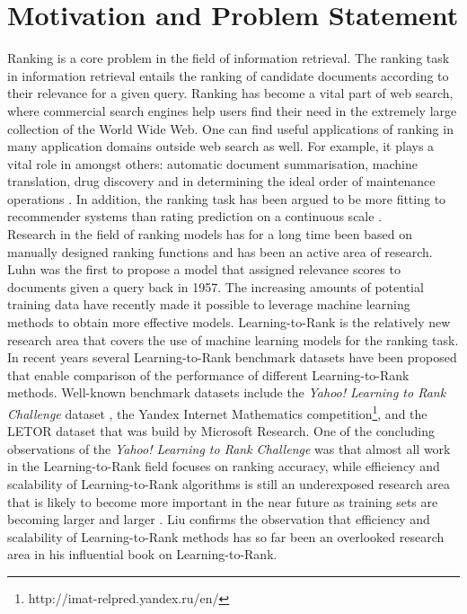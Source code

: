 \chapter{Motivation and Problem Statement}
Ranking is a core problem in the field of information retrieval. The ranking task in information retrieval entails the ranking of candidate documents according to their relevance for a given query. Ranking has become a vital part of web search, where commercial search engines help users find their need in the extremely large collection of the World Wide Web. One can find useful applications of ranking in many application domains outside web search as well. For example, it plays a vital role in amongst others: automatic document summarisation, machine translation, drug discovery and in determining the ideal order of maintenance operations \cite{Rudin2009}. In addition, the ranking task has been argued to be more fitting to recommender systems than rating prediction on a continuous scale \cite{Adomavicius2005,McNee2006}.\\

Research in the field of ranking models has for a long time been based on manually designed ranking functions and has been an active area of research. Luhn \cite{Luhn1957} was the first to propose a model that assigned relevance scores to documents given a query back in 1957. The increasing amounts of potential training data have recently made it possible to leverage machine learning methods to obtain more effective models. Learning-to-Rank is the relatively new research area that covers the use of machine learning models for the ranking task.\\

In recent years several Learning-to-Rank benchmark datasets have been proposed that enable comparison of the performance of different Learning-to-Rank methods. Well-known benchmark datasets include the \emph{Yahoo! Learning to Rank Challenge} dataset \cite{Chapelle2011a}, the Yandex Internet Mathematics competition\footnote{http://imat-relpred.yandex.ru/en/}, and the LETOR dataset \cite{Qin2010} that was build by Microsoft Research. One of the concluding observations of the \emph{Yahoo! Learning to Rank Challenge} was that almost all work in the Learning-to-Rank field focuses on ranking accuracy, while efficiency and scalability of Learning-to-Rank algorithms is still an underexposed research area that is likely to become more important in the near future as training sets are becoming larger and larger \cite{Chapelle2011b}. Liu \cite{Liu2007} confirms the observation that efficiency and scalability of Learning-to-Rank methods has so far been an overlooked research area in his influential book on Learning-to-Rank.\\

